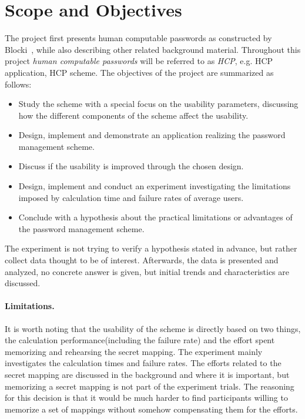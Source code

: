 
\section{Scope and Objectives}
The project first presents human computable passwords as constructed by Blocki~\cite{hcp-blocki}, while also describing other related background material. Throughout this project \emph{human computable passwords} will be referred to as \emph{HCP}, e.g. HCP application, HCP scheme. The objectives of the project are summarized as follows:
\begin{itemize}
    \item Study the scheme with a special focus on the usability parameters, discussing how the different components of the scheme affect the usability.
    \item Design, implement and demonstrate an application realizing the password management scheme.
    \item Discuss if the usability is improved through the chosen design. 
    \item Design, implement and conduct an experiment investigating the limitations imposed by calculation time and failure rates of average users.
    \item Conclude with a hypothesis about the practical limitations or advantages of the password management scheme.
\end{itemize}
\par The experiment is not trying to verify a hypothesis stated in advance, but rather collect data thought to be of interest. Afterwards, the data is presented and analyzed, no concrete answer is given, but initial trends and characteristics are discussed.
\paragraph{Limitations.}
It is worth noting that the usability of the scheme is directly based on two things, the calculation performance(including the failure rate) and the effort spent memorizing and rehearsing the secret mapping. The experiment mainly investigates the calculation times and failure rates. The efforts related to the secret mapping are discussed in the background and where it is important, but memorizing a secret mapping is not part of the experiment trials. The reasoning for this decision is that it would be much harder to find participants willing to memorize a set of mappings without somehow compensating them for the efforts.



